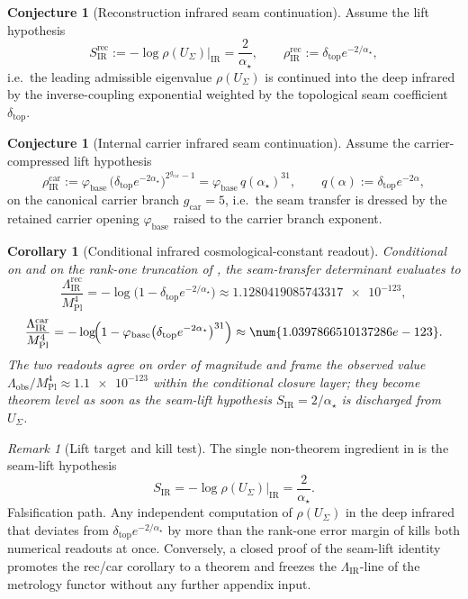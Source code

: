 \documentclass[11pt,a4paper]{article}
\newtheorem{corollary}[theorem]{Corollary}
\theoremstyle{definition}
\newtheorem{conjecture}[theorem]{Conjecture}
\theoremstyle{remark}
\newtheorem*{remark}{Remark}
\newcommand{\Mplunred}{M_{\mathrm{Pl}}}
\newcommand{\phibase}{\varphi_{\mathrm{base}}}
\newcommand{\deltatop}{\delta_{\mathrm{top}}}
\newcommand{\gcar}{g_{\mathrm{car}}}
\begin{document}
\begin{conjecture}[Reconstruction infrared seam continuation]
\label{conj:ir-seam-rec-continuation}
Assume the lift hypothesis
\[
S_{\mathrm{IR}}^{\mathrm{rec}}
:=
-\log\rho(U_\Sigma)\bigl|_{\mathrm{IR}}
=
\frac{2}{\alpha_\star},
\qquad
\rho_{\mathrm{IR}}^{\mathrm{rec}}
:=
\deltatop e^{-2/\alpha_\star},
\]
i.e.\ the leading admissible eigenvalue $\rho(U_\Sigma)$ is continued into the deep infrared by the
inverse-coupling exponential weighted by the topological seam coefficient $\deltatop$.
\end{conjecture}

\begin{conjecture}[Internal carrier infrared seam continuation]
\label{conj:ir-seam-car-continuation}
Assume the carrier-compressed lift hypothesis
\[
\rho_{\mathrm{IR}}^{\mathrm{car}}
:=
\phibase\,\bigl(\deltatop e^{-2\alpha_\star}\bigr)^{2^{\gcar}-1}
=
\phibase\,q(\alpha_\star)^{31},
\qquad
q(\alpha):=\deltatop e^{-2\alpha},
\]
on the canonical carrier branch $\gcar=5$, i.e.\ the seam transfer is dressed by the retained
carrier opening $\phibase$ raised to the carrier branch exponent.
\end{conjecture}

\begin{corollary}[Conditional infrared cosmological-constant readout]
\label{cor:conditional-lambda-ir-readout}
Conditional on  and on the
rank-one truncation of , the seam-transfer determinant evaluates
to
\[
\frac{\Lambda_{\mathrm{IR}}^{\mathrm{rec}}}{\Mplunred^4}
=
-\log\!\bigl(1-\deltatop e^{-2/\alpha_\star}\bigr)
\approx
\num{1.1280419085743317e-123},
\]
\[
\frac{\Lambda_{\mathrm{IR}}^{\mathrm{car}}}{\Mplunred^4}
=
-\log\!\Bigl(1-\phibase\bigl(\deltatop e^{-2\alpha_\star}\bigr)^{31}\Bigr)
\approx
\num{1.0397866510137286e-123}.
\]
The two readouts agree on order of magnitude and frame the observed value
$\Lambda_{\mathrm{obs}}/\Mplunred^4\approx\num{1.1e-123}$ within the conditional closure layer; they
become \emph{theorem level} as soon as the seam-lift hypothesis $S_{\mathrm{IR}}=2/\alpha_\star$ is
discharged from $U_\Sigma$.
\end{corollary}

\begin{remark}[Lift target and kill test]
The single non-theorem ingredient in  is the seam-lift
hypothesis
\[
S_{\mathrm{IR}}=-\log\rho(U_\Sigma)\bigl|_{\mathrm{IR}}=\frac{2}{\alpha_\star}.
\]
Falsification path. Any independent computation of $\rho(U_\Sigma)$ in the deep infrared that
deviates from $\deltatop e^{-2/\alpha_\star}$ by more than the rank-one error margin of
 kills both numerical readouts at once. Conversely, a closed
proof of the seam-lift identity promotes the rec/car corollary to a theorem and freezes the
\(\Lambda_{\mathrm{IR}}\)-line of the metrology functor without any further appendix input.
\end{remark}
\end{document}
